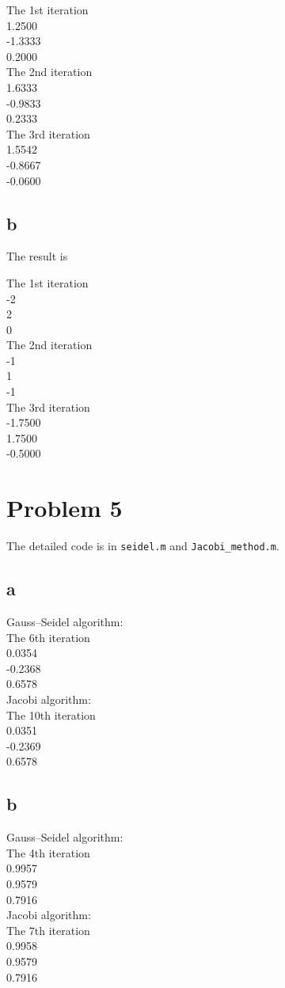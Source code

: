 \documentclass[11pt,a4paper]{report}
\theoremstyle{remark}
\begin{document}
The 1st iteration \\
    1.2500 \\
   -1.3333 \\
    0.2000 \\

The 2nd iteration \\
  1.6333 \\
   -0.9833 \\
    0.2333 \\

The 3rd iteration \\
    1.5542 \\ 
   -0.8667 \\
   -0.0600 \\
\subsection*{b}
The result is

The 1st iteration \\
    -2 \\
     2 \\
     0 \\

The 2nd iteration \\
    -1 \\
     1 \\
    -1 \\

The 3rd iteration \\
   -1.7500 \\
    1.7500 \\
   -0.5000 \\
\section*{Problem 5}

The detailed code is in \texttt{seidel.m} and \texttt{Jacobi\_method.m}.
\subsection*{a}
Gauss--Seidel algorithm: \\
The 6th iteration \\
    0.0354 \\
   -0.2368 \\
    0.6578 \\
Jacobi algorithm: \\
The 10th iteration \\
    0.0351 \\
   -0.2369 \\
    0.6578 \\
\subsection*{b}
Gauss--Seidel algorithm: \\
The 4th iteration \\
    0.9957\\
    0.9579\\
    0.7916\\
Jacobi algorithm: \\
The 7th iteration\\
    0.9958\\
    0.9579\\
    0.7916\\
\end{document}
